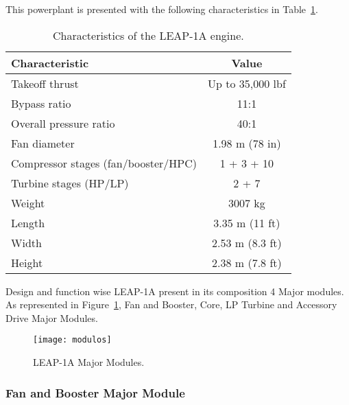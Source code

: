 This powerplant is presented with the following characteristics in Table~\ref{tab:leapcha}.
\begin{table}[ht]
    \caption{Characteristics of the \gls{LEAP}-1A engine.\cite{MTU_LEAP}}
    \label{tab:leapcha}
    \centering
    \begin{tabular}{lc}
    \hline
    \textbf{Characteristic} & \textbf{Value} \\ \hline
    Takeoff thrust                      & Up to 35,000 lbf   \\
    Bypass ratio                        & 11:1                \\
    Overall pressure ratio              & 40:1                \\
    Fan diameter                        & 1.98 m (78 in)      \\
    Compressor stages (fan/booster/HPC) & 1 + 3 + 10          \\
    Turbine stages (HP/LP)              & 2 + 7               \\
    Weight                              & 3007 kg             \\
    Length                              & 3.35 m (11 ft)      \\
    Width                               & 2.53 m (8.3 ft)     \\
    Height                              & 2.38 m (7.8 ft)     \\ \hline
    \end{tabular}
\end{table}



Design and function wise \gls{LEAP}-1A present in its composition 4 Major modules. As represented in Figure~\ref{fig:modules}, Fan and Booster, Core, \gls{LP} Turbine and Accessory Drive Major Modules.

\begin{figure}[H]
    \centering
    \texttt{[image: modulos]}
    \caption{\gls{LEAP}-1A Major Modules.\cite{Leeham_HighTurbine}}
    \label{fig:modules}
\end{figure}


\subsubsection{Fan and Booster Major Module}
\label{subsubsec:fan_booster}

